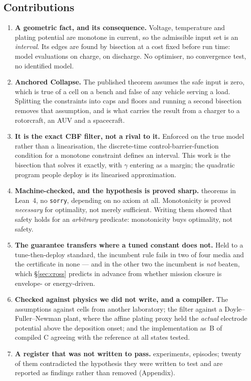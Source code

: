 \documentclass[11pt,letterpaper]{article}
\theoremstyle{definition}
\theoremstyle{remark}
\begin{document}
\subsection{Contributions}

\begin{enumerate}\itemsep2pt
\item \textbf{A geometric fact, and its consequence.} Voltage, temperature and plating potential
are monotone in current, so the admissible input set is an \emph{interval}. Its edges are found
by bisection at a cost fixed before run time: \evalCharge{} model evaluations on charge,
\evalDischarge{} on discharge. No optimiser, no convergence test, no identified model.

\item \textbf{Anchored Collapse.} The published theorem assumes the safe input is zero, which is
true of a cell on a bench and false of any vehicle serving a load. Splitting the constraints into
caps and floors and running a second bisection removes that assumption, and is what carries the
result from a charger to a rotorcraft, an AUV and a spacecraft.

\item \textbf{It is the exact CBF filter, not a rival to it.} Enforced on the true model rather
than a linearisation, the discrete-time control-barrier-function condition for a monotone
constraint defines an interval. This work is the bisection that solves it exactly, with $\gamma$
entering as a margin; the quadratic program people deploy is its linearised approximation.

\item \textbf{Machine-checked, and the hypothesis is proved sharp.} \leanThms{} theorems in
Lean~4, no \texttt{sorry}, \leanFreeWord{} depending on no axiom at all. Monotonicity is proved
\emph{necessary} for optimality, not merely sufficient. Writing them showed that safety holds for an
\emph{arbitrary} predicate: monotonicity buys optimality, not safety.

\item \textbf{The guarantee transfers where a tuned constant does not.} Held to a
tune-then-deploy standard, the incumbent rule fails in two of four media and the certificate in
none --- and in the other two the incumbent is \emph{not} beaten, which
\S\ref{sec:cross} predicts in advance from whether mission closure is envelope- or energy-driven.

\item \textbf{Checked against physics we did not write, and a compiler.} The assumptions against
\nCells{} cells from another laboratory; the filter against a Doyle--Fuller--Newman plant, where
the affine plating proxy held the \emph{actual} electrode potential above the deposition onset;
and the implementation as \fwText\,B of compiled C agreeing with the reference at all
\fwStates{} states tested.

\item \textbf{A register that was not written to pass.} \vExperiments{} experiments,
\vTotalEpisodes{} episodes; twenty of them contradicted the hypothesis they were written to test
and are reported as findings rather than removed (Appendix).
\end{enumerate}
\end{document}
